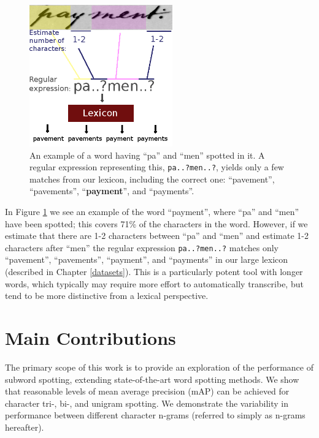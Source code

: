 \documentclass[ms,electronic,twosidetoc,letterpaper,chaptercenter,parttop,lof,lot]{byumsphd}
\begin{document}
\begin{figure}
    \centering
    \includegraphics[width=0.55\textwidth]{spotting_completion_payment}
    \caption{An example of a word having ``pa'' and ``men'' spotted in it. A regular expression representing this, \texttt{pa..?men..?}, yields only a few matches from our lexicon, including the correct one: ``pavement'', ``pavements'', ``\textbf{payment}'', and ``payments''.}
    \label{fig:subtransexample}
\end{figure}

In Figure \ref{fig:subtransexample} we see an example of the word ``payment'', where ``pa'' and ``men'' have been spotted; this covers 71\% of the characters in the word. However, if we estimate that there are 1-2 characters between ``pa'' and ``men'' and estimate 1-2 characters after ``men'' the regular expression \texttt{pa..?men..?} matches only ``pavement'', ``pavements'', ``payment'', and ``payments'' in our large lexicon (described in Chapter \ref{datasets}). This is a particularly potent tool with longer words, which typically may require more effort to automatically transcribe, but tend to be more distinctive from a lexical perspective.




\section{Main Contributions}

The primary scope of this work is to provide an exploration of the performance of subword spotting, extending state-of-the-art word spotting methods.
We show that reasonable levels of mean average precision (mAP) can be achieved for character tri-, bi-, and unigram spotting. We demonstrate the variability in performance between different character n-grams (referred to simply as n-grams hereafter).
\end{document}
